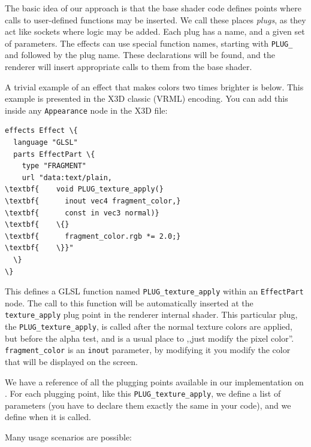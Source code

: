 \documentclass{egpubl}
\begin{document}
The basic idea of our approach is that the base shader code defines
points where calls to user-defined functions may be inserted. We call
these places \textit{plugs}, as they act like sockets where logic
may be added. Each plug has a name, and a given set of parameters.
The effects can use special function names, starting with \texttt{PLUG\_}
and followed by the plug name. These declarations will be found,
and the renderer will insert appropriate calls to them from the base shader.

A trivial example of an effect that makes colors two times brighter
is below. This example is presented in the X3D classic (VRML) encoding.
You can add this inside any \texttt{Appearance} node in the X3D file:

\begin{Verbatim}[commandchars=\\\{\},frame=single]
effects Effect \{
  language "GLSL"
  parts EffectPart \{
    type "FRAGMENT"
    url "data:text/plain,
\textbf{    void PLUG_texture_apply(}
\textbf{      inout vec4 fragment_color,}
\textbf{      const in vec3 normal)}
\textbf{    \{}
\textbf{      fragment_color.rgb *= 2.0;}
\textbf{    \}}"
  \}
\}
\end{Verbatim}

This defines a GLSL function named \texttt{PLUG\_texture\_apply}
within an \texttt{EffectPart} node. The call to this function will
be automatically inserted at the \texttt{texture\_apply} plug point in
the renderer internal shader. This particular plug,
the \texttt{PLUG\_texture\_apply}, is called after the normal texture colors
are applied, but before the alpha test, and is a usual place to ,,just modify the pixel color''.
\texttt{fragment\_color} is an \texttt{inout} parameter, by modifying it
you modify the color that will be displayed on the screen.

We have a reference of all the plugging points available in our implementation
on .
For each plugging point,
like this \texttt{PLUG\_texture\_apply}, we define a list of parameters
(you have to declare them exactly the same in your code), and we define
when it is called.

Many usage scenarios are possible:
\end{document}
